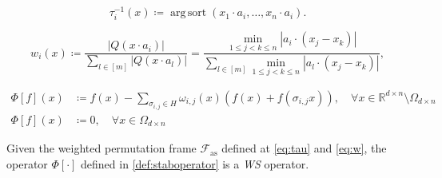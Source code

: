 \documentclass[10pt,a4paper]{amsart}
\DeclareMathOperator*{\argsort}{arg\,sort}
\newcommand{\RR}{\mathbb{R}}
\newcommand{\abs}[1]{\left\lvert#1\right\rvert}
\begin{document}
\begin{equation} \label{eq:tau}
	 \tau_i^{-1}(x) \coloneq \argsort{\left(x_1 \cdot a_i, \dots, x_n \cdot a_i \right)}  .\end{equation}

\begin{equation}\label{eq:w}
	w_i(x) \coloneq \frac{\abs{Q\left(x \cdot a_i \right)}}{\sum_{l \in [m]}{\abs{Q\left(x \cdot a_l \right)}}}=\frac{\min_{1\leq j<k\leq n} |a_i \cdot(x_j-x_k) |  }{\sum_{l\in[m]}\min_{1\leq j<k\leq n} |a_l \cdot(x_j-x_k) | },
\end{equation}

\begin{align} \label{def:staboperator}
        \Phi[f](x) &\coloneq f(x) - \sum_{\sigma_{i,j} \in H}{\omega_{i,j}(x)\left(f(x) + f(\sigma_{i,j} x) \right)}, \quad \forall x\in \RR^{d\times n}\setminus \Omega_{d\times n}\\
         \Phi[f](x) &\coloneq 0, \quad \forall x \in \Omega_{d\times n} \nonumber
\end{align}

\begin{prop} \label{prop:stab_operator_correct}
Given the weighted permutation frame $\mathcal{F}_{\text{as}} $ defined at \eqref{eq:tau} and \eqref{eq:w}, the operator $\Phi[\cdot]$ defined in \eqref{def:staboperator} is a  \textit{WS} operator.
\end{prop}
\end{document}
